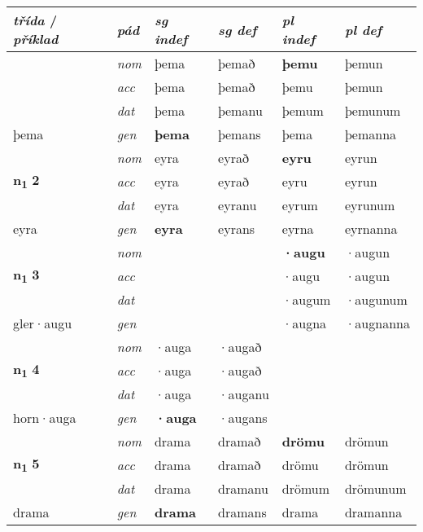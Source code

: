 
\begin{longtable}[l]{X>{\footnotesize\itshape}XXXXX}
\toprule
{\textbf{\textit{třída}} / \textit{příklad}} & {\textit{pád}} & {\textit{sg indef}} & {\textit{sg def}} & {\textit{pl indef}} & {\textit{pl def}}\\ \midrule
\endhead
\bottomrule
\endfoot
\multirow{3}{*}{{{\textbf{n{\textsubscript{1}}} \Large{\textbf{1}}}}} & nom & þema & þemað & \textbf{þemu} & þemun \\*
 & acc & þema & þemað & þemu & þemun \\*
 & dat & þema & þemanu & þemum & þemunum \\*
 {\footnotesize{þema}} & gen & \textbf{þema} & þemans & þema & þemanna \\
\cmidrule{1-6}

\multirow{3}{*}{{{\textbf{n{\textsubscript{1}}} \Large{\textbf{2}}}}} & nom & eyra & eyrað & \textbf{eyru} & eyrun \\*
 & acc & eyra & eyrað & eyru & eyrun \\*
 & dat & eyra & eyranu & eyrum & eyrunum \\*
 {\footnotesize{eyra}} & gen & \textbf{eyra} & eyrans & eyrna & eyrnanna \\
\cmidrule{1-6}

\multirow{3}{*}{{{\textbf{n{\textsubscript{1}}} \Large{\textbf{3}}}}} & nom &  &  & \textbf{·augu} & ·augun \\*
 & acc &  &  & ·augu & ·augun \\*
 & dat &  &  & ·augum & ·augunum \\*
 {\footnotesize{gler\allowbreak ·augu}} & gen & \textbf{} &  & ·augna & ·augnanna \\
\cmidrule{1-6}

\multirow{3}{*}{{{\textbf{n{\textsubscript{1}}} \Large{\textbf{4}}}}} & nom & ·auga & ·augað & \textbf{} &  \\*
 & acc & ·auga & ·augað &  &  \\*
 & dat & ·auga & ·auganu &  &  \\*
 {\footnotesize{horn\allowbreak ·auga}} & gen & \textbf{·auga} & ·augans &  &  \\
\cmidrule{1-6}

\multirow{3}{*}{{{\textbf{n{\textsubscript{1}}} \Large{\textbf{5}}}}} & nom & drama & dramað & \textbf{drömu} & drömun \\*
 & acc & drama & dramað & drömu & drömun \\*
 & dat & drama & dramanu & drömum & drömunum \\*
 {\footnotesize{drama}} & gen & \textbf{drama} & dramans & drama & dramanna \\
\cmidrule{1-6}


\end{longtable}
